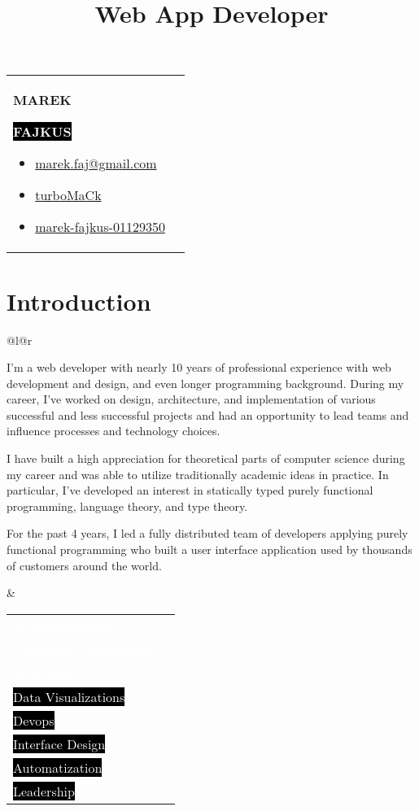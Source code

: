 \documentclass[9pt]{article}
\makeatletter
\def\firstname{Marek}
\def\lastname{Fajkus}
\def\faEmail{{\FAFR \symbol{"F0E0}}} %
\def\faLinkedin{\FAB \symbol{"F08C}} %
\def\faGithub{\FAB \symbol{"F09B}} %
\def\faStarEmpty{\FAFR \symbol{"F005}} %
\def\faStarFull{\FAFS \symbol{"F005}} %
\def\faStarHalf{\FAFS \symbol{"F5C0}} %
\renewcommand{\maketitle}{
  \begin{tabularx}{\textwidth}{@{}l l}
    \begin{minipage}[t]{0.65\textwidth}
      {\Huge \textbf {\MakeUppercase{\firstname}}}

      \vspace{0.2cm}

      \colorbox{black}{
        {\huge \textbf {\textcolor{white}{\MakeUppercase{\lastname}}}}
      }

      \vspace{0.4cm}

      {\LARGE\emph\thetitle}
    \end{minipage}

    \begin{minipage}[t]{0.35\textwidth}
      \vspace{-\baselineskip} %
      \begin{itemize}
        \itemsep0em
      \vspace{-0.5cm}
      \item \href{mailto:marek.faj@gmail.com}{
        \colorbox{ProcessBlue}{\textcolor{white}{\faEmail}} { \textcolor{ProcessBlue}{marek.faj@gmail.com}}
      }
      \item \href{https://github.com/turbomack}{
        \colorbox{black}{\textcolor{white}{\faGithub}} { turboMaCk}
      }
      \item \href{https://www.linkedin.com/in/marek-fajkus-01129350/}{
        \colorbox{black}{\textcolor{white}{\faLinkedin}} { marek-fajkus-01129350}
      }
      \end{itemize}
    \end{minipage}
  \end{tabularx}

  \vspace{0.5cm}
}
\newcommand{\skill}[3]{ %
  \colorbox{#3}{\textcolor{white}{#1}} &
  \vspace{0.2cm}
  \textcolor{#3}{
    \newcount \n
    \n #2
    \multido{\i=0+10}{5}{%
      \ifnum\n<10
        \ifnum\n>0 \faStarHalf \else \faStarEmpty \fi
      \else
        \faStarFull
      \fi
      \advance\n -10
    }
  } \\
}
\makeatother
\begin{document}
\title{Web App Developer}

\lhead{}
\rhead{}

\thispagestyle{empty}

\maketitle

\section{Introduction}

\begin{tabular}{@{}l@{\hskip 20pt}r}
    \begin{minipage}[l]{0.58\textwidth}

      I'm a web developer with nearly 10 years of professional experience
      with web development and design, and even longer programming background.
      During my career, I've worked on design, architecture, and implementation
      of various successful and less successful projects and had an opportunity
      to lead teams and influence processes and technology choices.

      \vspace{0.5em}
      I have built a high appreciation for theoretical parts of computer science during my career
      and was able to utilize traditionally academic ideas in practice.
      In particular, I've developed an interest in statically typed purely functional programming,
      language theory, and type theory.

      \vspace{0.5em}
      For the past 4 years, I led a fully distributed team of developers applying
      purely functional programming who built a user interface application used by thousands
      of customers around the world.

    \end{minipage}
    &
    \begin{minipage}[r]{0.39\textwidth}
      \setlength\tabcolsep{5pt}
      \begin{tabularx}{\textwidth}{Xr}
        \skill{Web Technologies}{45}{ProcessBlue}
        \skill{Functional Programming}{40}{ProcessBlue}
        \skill{Web Services}{35}{ProcessBlue}
        \skill{Data Visualizations}{30}{black}
        \skill{Devops}{25}{black}
        \skill{Interface Design}{25}{black}
        \skill{Automatization}{30}{black}
        \skill{Leadership}{30}{black}
      \end{tabularx}
    \end{minipage} \\
\end{tabular}
\end{document}
